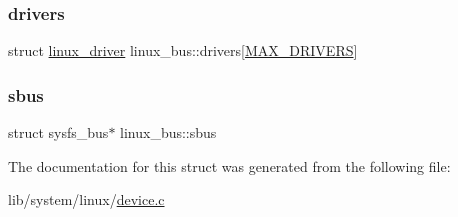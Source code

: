 \mbox{\label{structlinux__bus_a44f6db1cb39b2ae4e996c96bb9e11931}} 
\subsubsection{\texorpdfstring{drivers}{drivers}}
{\footnotesize\ttfamily struct \hyperlink{structlinux__driver}{linux\+\_\+driver} linux\+\_\+bus\+::drivers\mbox{[}\hyperlink{system_2linux_2device_8c_ac2ee6026a11a2d8472c29fed769c7e9f}{M\+A\+X\+\_\+\+D\+R\+I\+V\+E\+RS}\mbox{]}}

\mbox{\label{structlinux__bus_a213e122d9780d9ffb83cd84993b9c8e8}} 
\subsubsection{\texorpdfstring{sbus}{sbus}}
{\footnotesize\ttfamily struct sysfs\+\_\+bus$\ast$ linux\+\_\+bus\+::sbus}



The documentation for this struct was generated from the following file\+:\begin{DoxyCompactItemize}
\item 
lib/system/linux/\hyperlink{system_2linux_2device_8c}{device.\+c}\end{DoxyCompactItemize}
